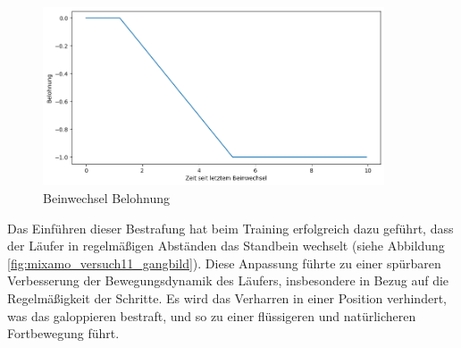 \begin{figure}[H]
  \centering
  \includegraphics[width=0.9\textwidth]{img/plot_beinwechsel} 
  \caption{Beinwechsel Belohnung}
  \label{fig:plot_beinwechsel}
\end{figure}

Das Einführen dieser Bestrafung hat beim Training erfolgreich dazu geführt, dass der Läufer in regelmäßigen Abständen das Standbein wechselt (siehe Abbildung \ref{fig:mixamo_versuch11_gangbild}). Diese Anpassung führte zu einer spürbaren Verbesserung der Bewegungsdynamik des Läufers, insbesondere in Bezug auf die Regelmäßigkeit der Schritte. Es wird das Verharren in einer Position verhindert, was das galoppieren bestraft, und so zu einer flüssigeren und natürlicheren Fortbewegung führt.

